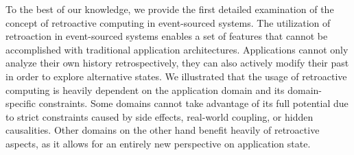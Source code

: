 To the best of our knowledge, we provide the first detailed examination of the 
concept of retroactive computing in event-sourced systems. 
The utilization of retroaction in event-sourced systems enables a set of features 
that cannot be accomplished with traditional application architectures. 
Applications cannot only analyze their own history retrospectively, they can also 
actively modify their past in order to explore alternative states.
%
We illustrated that the usage of retroactive computing is heavily dependent on 
the application domain and its domain-specific constraints. Some domains cannot 
take advantage of its full potential due to strict constraints caused by side 
effects, real-world coupling, or hidden causalities. Other domains on the other 
hand benefit heavily of retroactive aspects, as it allows for an entirely new 
perspective on application state.
